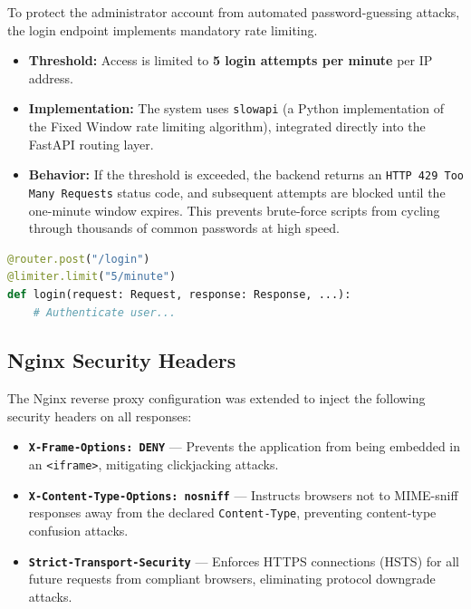\documentclass[12pt, a4paper]{article}
\begin{document}
To protect the administrator account from automated password-guessing attacks, the login endpoint implements mandatory rate limiting.

\begin{itemize}
    \item \textbf{Threshold:} Access is limited to \textbf{5 login attempts per minute} per IP address.
    \item \textbf{Implementation:} The system uses \texttt{slowapi} (a Python implementation of the Fixed Window rate limiting algorithm), integrated directly into the FastAPI routing layer.
    \item \textbf{Behavior:} If the threshold is exceeded, the backend returns an \texttt{HTTP 429 Too Many Requests} status code, and subsequent attempts are blocked until the one-minute window expires. This prevents brute-force scripts from cycling through thousands of common passwords at high speed.
\end{itemize}

\begin{lstlisting}[language=Python, caption={Rate limiting on login endpoint}]
@router.post("/login")
@limiter.limit("5/minute")
def login(request: Request, response: Response, ...):
    # Authenticate user...
\end{lstlisting}

\subsection{Nginx Security Headers}

The Nginx reverse proxy configuration was extended to inject the following security headers on all responses:

\begin{itemize}
    \item \textbf{\texttt{X-Frame-Options: DENY}} — Prevents the application from being embedded in an \texttt{<iframe>}, mitigating clickjacking attacks.
    \item \textbf{\texttt{X-Content-Type-Options: nosniff}} — Instructs browsers not to MIME-sniff responses away from the declared \texttt{Content-Type}, preventing content-type confusion attacks.
    \item \textbf{\texttt{Strict-Transport-Security}} — Enforces HTTPS connections (HSTS) for all future requests from compliant browsers, eliminating protocol downgrade attacks.
\end{itemize}
\end{document}
